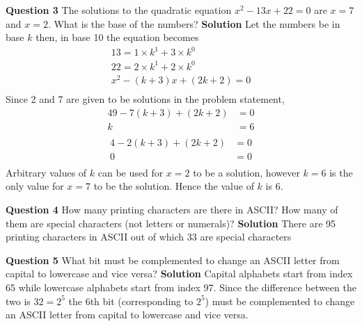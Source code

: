 \documentclass{article}
\begin{document}
\begin{enumerate}
\end{enumerate}

\textbf{Question 3}\newline
The solutions to the quadratic equation $x^2-13x+22 = 0$ are $x = 7$ and $x = 2$. What is the base of the numbers?
\newline
\textbf{Solution}\newline
Let the numbers be in base $k$ then, in base 10 the equation becomes
\begin{align*}
	13 = 1\times k^1+3\times k^0\\
	22 = 2\times k^1 + 2\times k^0\\
	x^2 - (k+3)x + (2k+2) = 0\\
\end{align*}
Since 2 and 7 are given to be solutions in the problem statement,
\begin{align*}
	49 - 7(k+3) + (2k+2) &= 0\\
	k &= 6\\
\end{align*}
\begin{align*}
	4 - 2(k+3) + (2k+2) &= 0\\
	0 &= 0 \\
\end{align*}
Arbitrary values of $k$ can be used for  $x=2$ to be a solution, however $k = 6$ is the only value for $x=7$ to be the solution. Hence the value of $k$ is 6.

\textbf{Question 4}\newline
How many printing characters are there in ASCII? How many of them are special characters (not letters or numerals)?\newline
\textbf{Solution}\newline
There are 95 printing characters in ASCII out of which 33 are special characters

\textbf{Question 5}\newline
What bit must be complemented to change an ASCII letter from capital to lowercase and vice versa?\newline
\textbf{Solution}\newline
Capital alphabets start from index 65 while lowercase alphabets start from index 97. Since the difference between the two is $32 = 2^5$ the 6th bit (corresponding to $2^5$) must be complemented to change an ASCII letter from capital to lowercase and vice versa.
\end{document}
